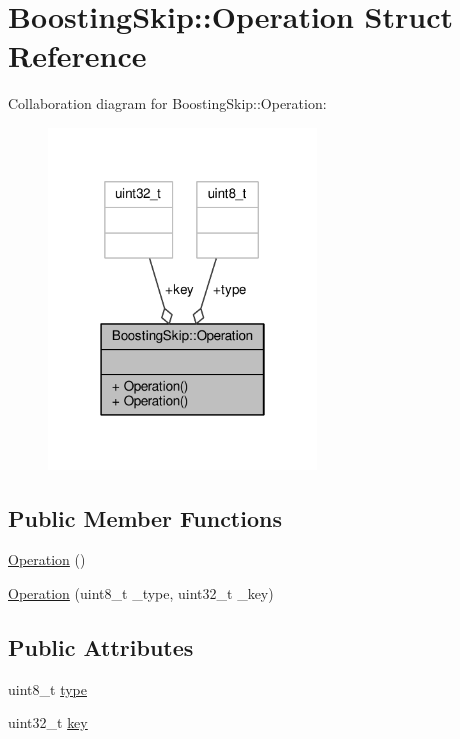 \hypertarget{structBoostingSkip_1_1Operation}{\section{Boosting\-Skip\-:\-:Operation Struct Reference}
\label{structBoostingSkip_1_1Operation}
}


Collaboration diagram for Boosting\-Skip\-:\-:Operation\-:
\nopagebreak
\begin{figure}[H]
\begin{center}
\leavevmode
\includegraphics[width=202pt]{structBoostingSkip_1_1Operation__coll__graph}
\end{center}
\end{figure}
\subsection*{Public Member Functions}
\begin{DoxyCompactItemize}
\item 
\hyperlink{structBoostingSkip_1_1Operation_a56f684990661816418cb6001eeb96412}{Operation} ()
\item 
\hyperlink{structBoostingSkip_1_1Operation_ab21aa5220c48438367ecfb68e29a9356}{Operation} (uint8\-\_\-t \-\_\-type, uint32\-\_\-t \-\_\-key)
\end{DoxyCompactItemize}
\subsection*{Public Attributes}
\begin{DoxyCompactItemize}
\item 
uint8\-\_\-t \hyperlink{structBoostingSkip_1_1Operation_a665f97528e64b59bdd5fc05e734c87e9}{type}
\item 
uint32\-\_\-t \hyperlink{structBoostingSkip_1_1Operation_aa498d6cb2c346d0b1470149617afc7d3}{key}
\end{DoxyCompactItemize}


